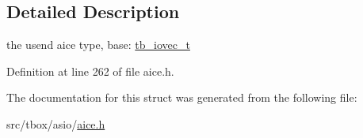 \subsection{Detailed Description}
the usend aice type, base\-: \hyperlink{structtb__iovec__t}{tb\-\_\-iovec\-\_\-t} 

Definition at line 262 of file aice.\-h.



The documentation for this struct was generated from the following file\-:\begin{DoxyCompactItemize}
\item 
src/tbox/asio/\hyperlink{aice_8h}{aice.\-h}\end{DoxyCompactItemize}
